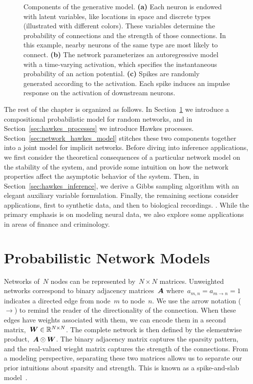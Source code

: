 \begin{figure}[t]
\begin{subfigure}[b]{1.7in}
    \label{fig:fig1_spikes}
  \end{subfigure}
  \vspace{-.2in}
  \caption[Components of the network Hawkes model]{
     Components of the generative model. 
     \textbf{(a)} Each neuron is endowed with latent variables, like 
     locations in space and discrete types (illustrated with different colors).
     These variables determine the probability of connections and the 
     strength of those connections. In this example, nearby neurons of the same 
     type are most likely to connect.
     \textbf{(b)} The network parameterizes an autoregressive model 
     with a time-varying activation, which specifies the instantaneous probability 
     of an action potential.
     \textbf{(c)} Spikes are randomly generated according to the 
     activation. Each spike induces an impulse response on the activation 
     of downstream neurons.}
  \label{fig:network_hawkes}
\end{figure}

The rest of the chapter is organized as follows. In
Section~\ref{sec:graph_models} we introduce a compositional
probabilistic model for random networks, and in
Section~\ref{sec:hawkes_processes} we introduce Hawkes processes.
Section~\ref{sec:network_hawkes_model} stitches these two components
together into a joint model for implicit networks.  Before diving into
inference applications, we first consider the theoretical consequences
of a particular network model on the stability of the system, and
provide some intuition on how the network properties affect the
asymptotic behavior of the system.  Then, in
Section~\ref{sec:hawkes_inference}, we derive a Gibbs sampling
algorithm with an elegant auxiliary variable formulation.  Finally,
the remaining sections consider applications, first to synthetic data,
and then to biological recordings. .  While the primary emphasis is on modeling neural data, we
also explore some applications in areas of finance and criminology.

\section{Probabilistic Network Models}
\label{sec:graph_models}
Networks of~$N$ nodes can be represented by~${N\times N}$
matrices. Unweighted networks correspond to binary adjacency matrices~$\boldsymbol{A}$
where~${a_{m,n}=a_{m \to n}=1}$ indicates a directed edge from
node~$m$ to node~$n$. We use the arrow notation ($\to$) to remind the
reader of the directionality of the connection. When these edges have
weights associated with them, we can encode them in a second matrix,~${\boldsymbol{W} \in
  \mathbb{R}^{N \times N}}$.  The complete network is then defined by the
elementwise product,~${\boldsymbol{A} \odot \boldsymbol{W}}$. The binary adjacency matrix
captures the sparsity pattern, and the real-valued wieght matrix
captures the strength of the connections. From a modeling perspective,
separating these two matrices allows us to separate our prior
intuitions about sparsity and strength. This is known as a
spike-and-slab model~\cite{Mitchell1988, Mohamed-2012}.


